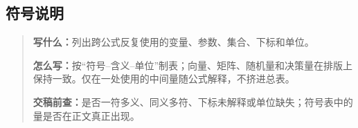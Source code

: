 \subsection{符号说明}
\begin{quote}\small
\noindent\textbf{\color{inkblue}写什么：}列出跨公式反复使用的变量、参数、集合、下标和单位。\par
\noindent\textbf{\color{inkblue}怎么写：}按“符号--含义--单位”制表；向量、矩阵、随机量和决策量在排版上保持一致。仅在一处使用的中间量随公式解释，不挤进总表。\par
\noindent\textbf{\color{inkblue}交稿前查：}是否一符多义、同义多符、下标未解释或单位缺失；符号表中的量是否在正文真正出现。
\end{quote}

